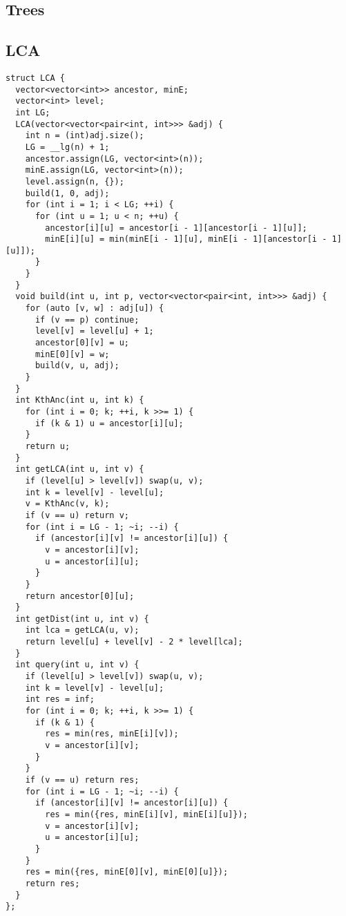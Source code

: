 \documentclass[twoside]{article}
\begin{document}
\begin{multicols*}{2}
{
\section*{Trees}
}
{
\subsection*{LCA}
}
\begin{verbatim}
struct LCA {
  vector<vector<int>> ancestor, minE;
  vector<int> level;
  int LG;
  LCA(vector<vector<pair<int, int>>> &adj) {
    int n = (int)adj.size();
    LG = __lg(n) + 1;
    ancestor.assign(LG, vector<int>(n));
    minE.assign(LG, vector<int>(n));
    level.assign(n, {});
    build(1, 0, adj);
    for (int i = 1; i < LG; ++i) {
      for (int u = 1; u < n; ++u) {
        ancestor[i][u] = ancestor[i - 1][ancestor[i - 1][u]];
        minE[i][u] = min(minE[i - 1][u], minE[i - 1][ancestor[i - 1][u]]);
      }
    }
  }
  void build(int u, int p, vector<vector<pair<int, int>>> &adj) {
    for (auto [v, w] : adj[u]) {
      if (v == p) continue;
      level[v] = level[u] + 1;
      ancestor[0][v] = u;
      minE[0][v] = w;
      build(v, u, adj);
    }
  }
  int KthAnc(int u, int k) {
    for (int i = 0; k; ++i, k >>= 1) {
      if (k & 1) u = ancestor[i][u];
    }
    return u;
  }
  int getLCA(int u, int v) {
    if (level[u] > level[v]) swap(u, v);
    int k = level[v] - level[u];
    v = KthAnc(v, k);
    if (v == u) return v;
    for (int i = LG - 1; ~i; --i) {
      if (ancestor[i][v] != ancestor[i][u]) {
        v = ancestor[i][v];
        u = ancestor[i][u];
      }
    }
    return ancestor[0][u];
  }
  int getDist(int u, int v) {
    int lca = getLCA(u, v);
    return level[u] + level[v] - 2 * level[lca];
  }
  int query(int u, int v) {
    if (level[u] > level[v]) swap(u, v);
    int k = level[v] - level[u];
    int res = inf;
    for (int i = 0; k; ++i, k >>= 1) {
      if (k & 1) {
        res = min(res, minE[i][v]);
        v = ancestor[i][v];
      }
    }
    if (v == u) return res;
    for (int i = LG - 1; ~i; --i) {
      if (ancestor[i][v] != ancestor[i][u]) {
        res = min({res, minE[i][v], minE[i][u]});
        v = ancestor[i][v];
        u = ancestor[i][u];
      }
    }
    res = min({res, minE[0][v], minE[0][u]});
    return res;
  }
};


\end{verbatim}
\end{multicols*}
\end{document}
